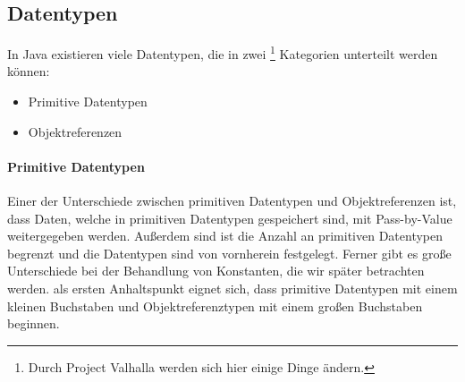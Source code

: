 \subsection{Datentypen}
	
	In Java existieren viele Datentypen, die in zwei \footnote{Durch Project Valhalla  werden sich hier einige Dinge ändern.} Kategorien unterteilt werden können: 
	\begin{itemize}
		\item Primitive Datentypen
		\item Objektreferenzen
	\end{itemize}
	
	\paragraph{Primitive Datentypen}
		Einer der Unterschiede zwischen primitiven Datentypen und Objektreferenzen ist, dass Daten, welche in primitiven Datentypen gespeichert sind, mit Pass-by-Value weitergegeben werden.  Außerdem sind ist die Anzahl an primitiven Datentypen begrenzt und die Datentypen sind von vornherein festgelegt. Ferner gibt es große Unterschiede bei der Behandlung von Konstanten, die wir später betrachten werden.  als ersten Anhaltspunkt eignet sich, dass primitive Datentypen mit einem kleinen Buchstaben und Objektreferenztypen mit einem großen Buchstaben beginnen.
		
